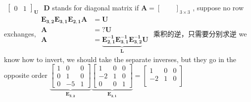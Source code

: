 \documentclass[12pt, a4paper]{article}
\begin{document}
{\begin{math}
\begin{aligned}
{\begin{bmatrix}
				0 & 1
			\end{bmatrix}
		}_{\mathbf{U}}
	\end{aligned}
\end{math}
\newline
{\textcolor{anhao-purple}{${\mathbf{D}}$ stands for diagonal matrix}}
\vspace{14pt}
\newline
if 
\begin{math}
	{\mathbf{A}} = 
	\begin{bmatrix}
		\ & \ 
	\end{bmatrix}_{3 \times 3}
\end{math}
, 
\newline
suppose no row exchanges, 
\newline
\begin{math}
	\begin{aligned}
		{\mathbf{E_{3,2}}}
		{\mathbf{E_{3,1}}}
		{\mathbf{E_{2,1}}}
		{\mathbf{A}}
		&= 
		{\mathbf{U}}
		\\
		{\mathbf{A}}
		&=
		{\boxed{?}}{\mathbf{U}}
		\\
		{\mathbf{A}}
		&=
		{
			\underbrace{
				{\mathbf{E_{2,1}^{-1}}}
				{\mathbf{E_{3,1}^{-1}}}
				{\mathbf{E_{3,2}^{-1}}}
			}_{\mathbf{L}}
		}
		{\mathbf{U}}
	\end{aligned}
\end{math}
\vspace{14pt}
\newline
{\textcolor{anhao-scarlet}{乘积的逆，只需要分别求逆}}
\newline
{\textcolor{anhao-scarlet}{we know how to invert, we should take the separate inverses, but they go in the opposite order}}
\vspace{14pt}
\newline
\begin{math}
	\underbrace{
		\begin{bmatrix}
			1 & 0 & 0 \\
			0 & 1 & 0 \\
			0 & -5 & 1
		\end{bmatrix}
	}_{\mathbf{E_{3,2}}}
	\underbrace{
		\begin{bmatrix}
			1 & 0 & 0 \\
			-2 & 1 & 0 \\
			0 & 0 & 1
		\end{bmatrix}
	}_{\mathbf{E_{2,1}}}
	 = 
	\begin{bmatrix}
		1 & 0 & 0 \\
		-2 & 1 & 0 \\

\end{bmatrix}
\end{math}}
\end{document}
